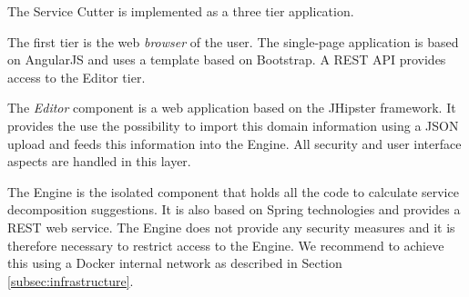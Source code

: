 \begin{minipage}[t]{0.5\textwidth}
	The Service Cutter is implemented as a three tier application.
	
	The first tier is the web \textit{browser} of the user. The single-page application is based on AngularJS\cite{angularjs} and uses a template based on Bootstrap\cite{bootstrap}. A REST API provides access to the Editor tier.
	
	The \textit{Editor} component is a web application based on the JHipster\cite{jhipster} framework. It provides the use the possibility to import this domain information using a JSON upload and feeds this information into the Engine. All security and user interface aspects are handled in this layer.
	
	The Engine is the isolated component that holds all the code to calculate service decomposition suggestions. It is also based on Spring technologies and provides a REST web service. The Engine does not provide any security measures and it is therefore necessary to restrict access to the Engine. We recommend to achieve this using a Docker\cite{docker} internal network as described in Section \ref{subsec:infrastructure}.
	
	
\end{minipage}

